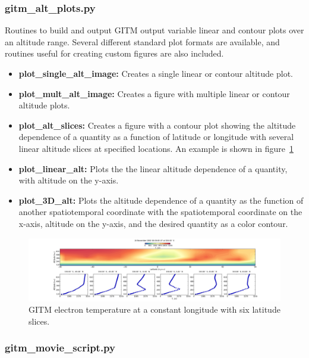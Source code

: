 \subsubsection{gitm\_alt\_plots.py}

Routines to build and output GITM output variable linear and contour plots over an altitude range.  Several different standard plot formats are available, and routines useful for creating custom figures are also included.

\begin{itemize}
\item[]{{\bf plot\_single\_alt\_image:}  Creates a single linear or contour altitude plot.}
\item[]{{\bf plot\_mult\_alt\_image:}  Creates a figure with multiple linear or contour altitude plots.}
\item[]{{\bf plot\_alt\_slices:}  Creates a figure with a contour plot showing the altitude dependence of a quantity as a function of latitude or longitude with several linear altitude slices at specified locations.  An example is shown in figure~\ref{gitm_alt_slices.fig}}
\item[]{{\bf plot\_linear\_alt:}  Plots the the linear altitude dependence of a quantity, with altitude on the y-axis.}
\item[]{{\bf plot\_3D\_alt:}  Plots the altitude dependence of a quantity as the function of another spatiotemporal coordinate with the spatiotemporal coordinate on the x-axis, altitude on the y-axis, and the desired quantity as a color contour.}
\end{itemize}

\begin{figure}
\begin{center}
\noindent\includegraphics[width=\textwidth]{Figures/gitm_alt_slice_test_Te.png}
\caption{GITM electron temperature at a constant longitude with six latitude slices.}
\label{gitm_alt_slices.fig}
\end{center}
\end{figure}

\subsubsection{gitm\_movie\_script.py}

